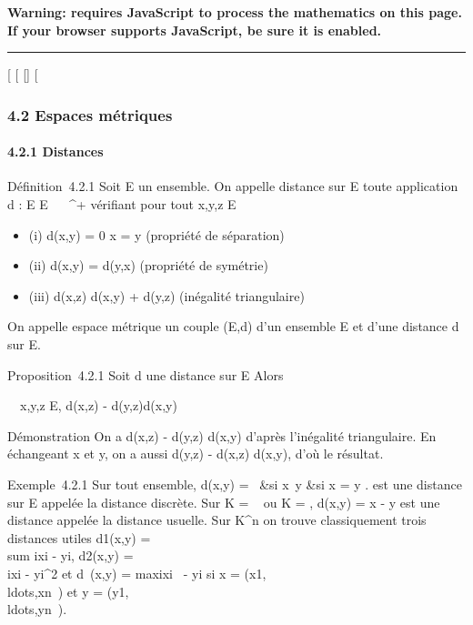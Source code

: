\textbf{Warning: 
requires JavaScript to process the mathematics on this page.\\ If your
browser supports JavaScript, be sure it is enabled.}

\begin{center}\rule{3in}{0.4pt}\end{center}

{[}
{[}
{[}{]}
{[}

\subsubsection{4.2 Espaces métriques}

\paragraph{4.2.1 Distances}

Définition~4.2.1 Soit E un ensemble. On appelle distance sur E toute
application d : E \times E \rightarrow~ ~^+ vérifiant pour tout x,y,z \in E

\begin{itemize}
\itemsep1pt\parskip0pt
\item
  (i) d(x,y) = 0 \Leftrightarrow x = y (propriété de
  séparation)
\item
  (ii) d(x,y) = d(y,x) (propriété de symétrie)
\item
  (iii) d(x,z) \leq d(x,y) + d(y,z) (inégalité triangulaire)
\end{itemize}

On appelle espace métrique un couple (E,d) d'un ensemble E et d'une
distance d sur E.

Proposition~4.2.1 Soit d une distance sur E Alors

\forall~~x,y,z \in E, \textbar{}d(x,z) -
d(y,z)\textbar{}\leq d(x,y)

Démonstration On a d(x,z) - d(y,z) \leq d(x,y) d'après l'inégalité
triangulaire. En échangeant x et y, on a aussi d(y,z) - d(x,z) \leq d(x,y),
d'où le résultat.

Exemple~4.2.1 Sur tout ensemble, d(x,y) = \left
\ &si
x\neq~y &si x = y
\cr  \right . est une distance sur E
appelée la distance discrète. Sur K = ~ ou K = , d(x,y) = \textbar{}x -
y\textbar{} est une distance appelée la distance usuelle. Sur
K^n on trouve classiquement trois distances utiles
d1(x,y) =\ \\sum
 i\textbar{}xi - yi\textbar{},
d2(x,y) =
\sqrt\\\sum
 i\textbar{}xi -
yi\textbar{}^2 et d\infty~(x,y)
= maxi\textbar{}xi~ -
yi\textbar{} si x =
(x1,\\ldots,xn~)
et y =
(y1,\\ldots,yn~).

